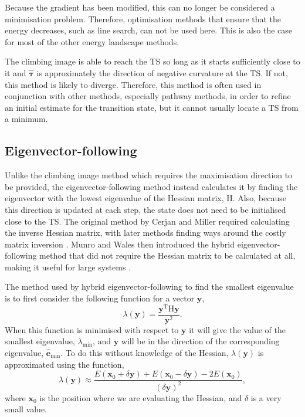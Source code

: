 Because the gradient has been modified, this can no longer be considered a minimisation problem.
Therefore, optimisation methods that ensure that the energy decreases, such as line search, can not be used here.
This is also the case for most of the other energy landscape methods.

The climbing image is able to reach the TS so long as it starts sufficiently close to it and $\bm{\hat{\tau}}$ is approximately the direction of negative curvature at the TS.
If not, this method is likely to diverge.
Therefore, this method is often used in conjunction with other methods, especially pathway methods, in order to refine an initial estimate for the transition state, but it cannot usually locate a TS from a minimum.


\subsection{Eigenvector-following}
Unlike the climbing image method which requires the maximisation direction to be provided, the eigenvector-following method \cite{Cerjan1981,Munro1999} instead calculates it by finding the eigenvector with the lowest eigenvalue of the Hessian matrix, $\mathrm{H}$.
Also, because this direction is updated at each step, the state does not need to be initialised close to the TS.
The original method by Cerjan and Miller \cite{Cerjan1981} required calculating the inverse Hessian matrix, with later methods finding ways around the costly matrix inversion \cite{Wales1994}.
Munro and Wales then introduced the hybrid eigenvector-following method that did not require the Hessian matrix to be calculated at all, making it useful for large systems \cite{Munro1999}.

The method used by hybrid eigenvector-following to find the smallest eigenvalue is to first consider the following function for a vector $\bm{y}$,
\begin{equation}
  \lambda(\bm{y}) = \frac{\bm{y}^\mathrm{T} \mathrm{H} \bm{y}} {\bm{y}^2}.
\end{equation}
When this function is minimised with respect to $\bm{y}$ it will give the value of the smallest eigenvalue, $\lambda_\text{min}$, and $\bm{y}$ will be in the direction of the corresponding eigenvalue, $\bm{\hat{e}}_\text{min}$.
To do this without knowledge of the Hessian, $\lambda(\bm{y})$ is approximated using the function,
\begin{equation}
  \lambda(\bm{y}) \approx \frac{E(\bm{x}_0 + \delta\bm{y}) + E(\bm{x}_0 - \delta\bm{y}) - 2 E(\bm{x}_0)} {(\delta \bm{y})^2},
\end{equation}
where $\bm{x}_0$ is the position where we are evaluating the Hessian, and $\delta$ is a very small value.

